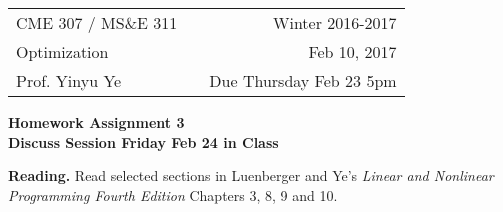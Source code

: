 \documentclass[12pt,letterpaper]{article}
\begin{document}
\pagestyle{empty}
\def \NATUR{ I \hspace*{-0.8ex} N}
\def \REALES{ I \hspace*{-0.8ex} R}
\renewcommand{\labelenumi}{\alph{enumi})}
\renewcommand{\labelenumii}{\roman{enumii})}
\newcommand*{\dprime}{^{\prime\prime}\mkern-1.2mu}

\hspace{-6mm}
\begin{tabular}{lcr}
CME 307 / MS\&E 311 & \hspace{3in} & Winter 2016-2017 \\ Optimization & & Feb 10, 2017 \\
Prof. Yinyu Ye & & Due Thursday Feb 23 5pm
\end{tabular}

\bigskip

\begin{center}
{\large \bf Homework Assignment 3 \\  Discuss Session Friday Feb 24 in Class}
\end{center}


\bigskip

{\textbf{Reading.}} Read selected sections in Luenberger and Ye's {\sl Linear
and Nonlinear Programming Fourth Edition} Chapters 3, 8, 9 and 10.
\end{document}
